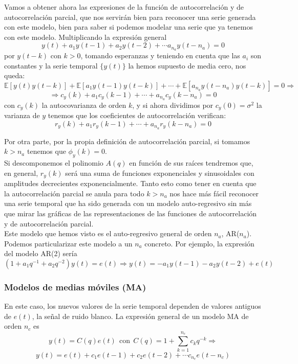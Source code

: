 Vamos a obtener ahora las expresiones de la función de autocorrelación y de autocorrelación parcial, que nos servirán bien para reconocer una serie generada con este modelo, bien para saber si podemos modelar una serie que ya tenemos con este modelo. Multiplicando la expresión general
\[	y(t) + a_1y(t-1) + a_2 y(t-2) + \cdots a_{n_a} y(t - n_a) = 0 \]
por $y(t-k)$ con $k>0$, tomando esperanzas y teniendo en cuenta que las $a_i$ son constantes y la serie temporal $\{y(t)\}$ la hemos supuesto de media cero, nos queda:
\[	\mathbb{E}[y(t)y(t-k)] + \mathbb{E}[a_1y(t-1)y(t-k)] + \cdots + \mathbb{E}[a_{n_a}y(t-n_a) y(t-k)] = 0 \Rightarrow	\]
\[	\Rightarrow c_y(k) + a_1 c_y(k-1) + \cdots + a_{n_a} c_y(k-n_a) = 0	\]
con $c_y(k)$ la autocovarianza de orden $k$, y si ahora dividimos por $c_y(0) = \sigma^2$ la varianza de $y$ tenemos que los coeficientes de autocorrelación verifican:
\[	r_y(k) + a_1r_y(k-1) + \cdots + a_{n_a} r_y(k-n_a) = 0	\]

Por otra parte, por la propia definición de autocorrelación parcial, si tomamos $k>n_a$ tenemos que $\phi_y(k) = 0$.\\

Si descomponemos el polinomio $A(q)$ en función de sus raíces tendremos que, en general, $r_y(k)$ será una suma de funciones exponenciales y sinusoidales con amplitudes decrecientes exponencialmente. Tanto esto como tener en cuenta que la autocorrelación parcial se anula para todo $k>n_a$ nos hace más fácil reconocer una serie temporal que ha sido generada con un modelo auto-regresivo sin más que mirar las gráficas de las representaciones de las funciones de autocorrelación y de autocorrelación parcial.\\

Este modelo que hemos visto es el auto-regresivo general de orden $n_a$, AR($n_a$). Podemos particularizar este modelo a un $n_a$ concreto. Por ejemplo, la expresión del modelo AR(2) sería
\[	(1+a_1q^{-1}+a_2q^{-2})y(t) = e(t) \Rightarrow y(t) = -a_1y(t-1)-a_2y(t-2) + e(t)	\]

\subsubsection{Modelos de medias móviles (MA)}

En este caso, los nuevos valores de la serie temporal dependen de valores antiguos de $e(t)$, la señal de ruido blanco. La expresión general de un modelo MA de orden $n_c$ es
\[ y(t) = C(q)e(t)\ \ \text{con}\ \ C(q) = 1 + \sum_{k=1}^{n_c} c_k q^{-k} \Rightarrow	\]
\begin{equation} \label{eq:MA}
y(t) = e(t) + c_1e(t-1) + c_2 e(t-2) + \cdots c_{n_c} e(t-n_c)
\end{equation}

